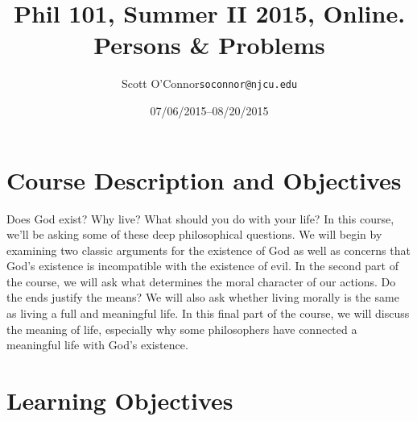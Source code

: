 \documentclass[11pt,article,oneside]{memoir}
\makeatletter
\def\myauthor{Author}
\def\mytitle{Title}
\def\mycopyright{\myauthor}
\def\myemail{soconnor@njcu.edu}
\def\myauthor{Scott O'Connor}
\def\mytitle{{\normalsize Phil 101, Summer II 2015, Online. \newline} \HUGE Persons \& Problems}
\makeatother
\begin{document}
\setsansfont[Mapping=tex-text]{Georgia} 
\setmonofont[Mapping=tex-text,Scale=0.8]{Georgia} 

\def\ind{\hangindent=1 true cm\hangafter=1 \noindent}
\def\labelitemi{$\cdot$}

\pagestyle{kjh}

\title{\LARGE \mytitle}     
\author{\Large\myauthor \newline \footnotesize\texttt{\noindent\myemail}}
\date{07/06/2015--08/20/2015}

\published{\,}

\maketitle




%
%

\section{Course Description and Objectives}

Does God exist? Why live? What should you do with your life?  In this
course, we'll be asking some of these deep philosophical questions. We
will begin by examining two classic arguments for the existence of God
as well as concerns that God's existence is incompatible with the
existence of evil. In the second part of the course, we will ask what determines the moral character of our actions. Do the ends justify the means? We will also ask whether living morally is the same as living a full and meaningful life. In this final part of the course, we will discuss the meaning of life, especially why some philosophers have connected a meaningful life with God's existence.

\section{Learning Objectives}
\end{document}
